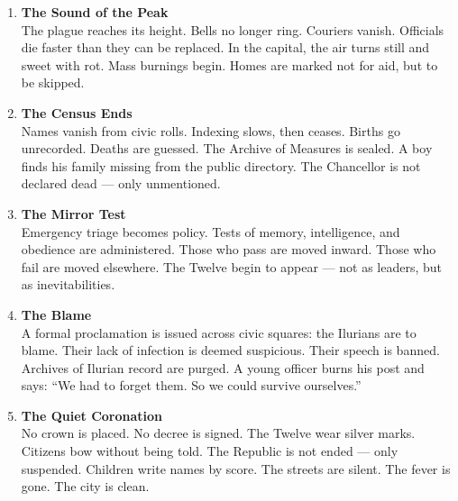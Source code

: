\documentclass[9pt]{article}
\begin{document}
\vspace{1in}

\begin{center}
\begin{enumerate}
    \item \textbf{The Sound of the Peak} \\
    The plague reaches its height. Bells no longer ring. Couriers vanish. Officials die faster than they can be replaced. In the capital, the air turns still and sweet with rot. Mass burnings begin. Homes are marked not for aid, but to be skipped.

    \vspace{.3in}
    \item \textbf{The Census Ends} \\
    Names vanish from civic rolls. Indexing slows, then ceases. Births go unrecorded. Deaths are guessed. The Archive of Measures is sealed. A boy finds his family missing from the public directory. The Chancellor is not declared dead — only unmentioned.

    \vspace{.3in}
    \item \textbf{The Mirror Test} \\
    Emergency triage becomes policy. Tests of memory, intelligence, and obedience are administered. Those who pass are moved inward. Those who fail are moved elsewhere. The Twelve begin to appear — not as leaders, but as inevitabilities.

    \vspace{.3in}
    \item \textbf{The Blame} \\
    A formal proclamation is issued across civic squares: the Ilurians are to blame. Their lack of infection is deemed suspicious. Their speech is banned. Archives of Ilurian record are purged. A young officer burns his post and says: “We had to forget them. So we could survive ourselves.”

    \vspace{.3in}
    \item \textbf{The Quiet Coronation} \\
    No crown is placed. No decree is signed. The Twelve wear silver marks. Citizens bow without being told. The Republic is not ended — only suspended. Children write names by score. The streets are silent. The fever is gone. The city is clean.
\end{enumerate}
\end{center}
\end{document}
